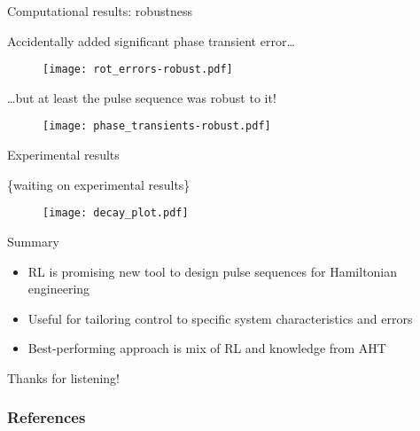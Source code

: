 \documentclass{beamer}
\begin{document}
\begin{frame}[allowframebreaks]%
{Computational results: robustness}

Accidentally added significant phase transient error\dots

\begin{figure}
\centering
\texttt{[image: rot\_errors-robust.pdf]}
\end{figure}

\break

\dots but at least the pulse sequence was robust to it!

\begin{figure}
\centering
\texttt{[image: phase\_transients-robust.pdf]}
\end{figure}

\end{frame}

\begin{frame}{Experimental results}

\{waiting on experimental results\}

\begin{figure}
\centering
\texttt{[image: decay\_plot.pdf]}
\end{figure}

\end{frame}

\begin{frame}{Summary}

\begin{itemize}
    \item RL is promising new tool to design pulse sequences for Hamiltonian engineering
    \item Useful for tailoring control to specific system characteristics and errors
    \item Best-performing approach is mix of RL and knowledge from AHT
\end{itemize}

\pause

Thanks for listening!

\end{frame}

\begin{frame}[allowframebreaks]
\frametitle{References}

\printbibliography

\end{frame}
\end{document}
